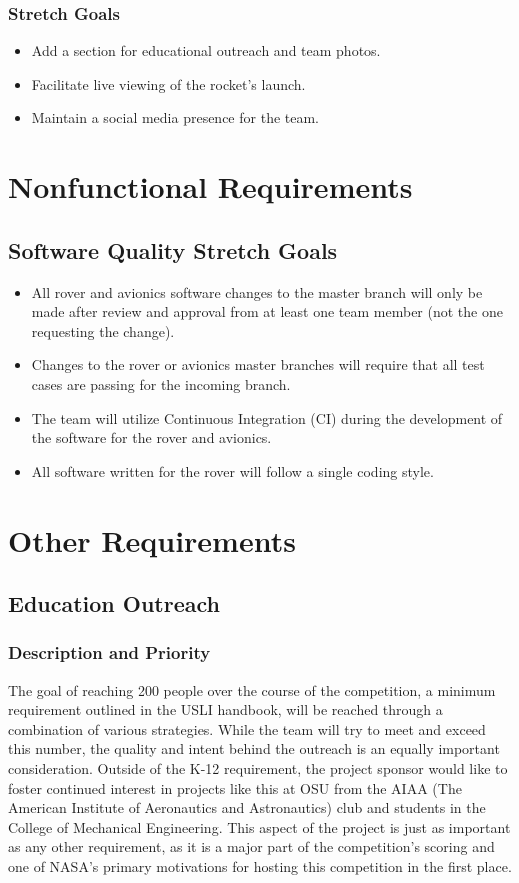\documentclass[onecolumn, draftclsnofoot, 10pt, compsoc]{IEEEtran}
\begin{document}
\subsubsection{Stretch Goals}
\begin{itemize}
\item Add a section for educational outreach and team photos.
\item Facilitate live viewing of the rocket's launch.
\item Maintain a social media presence for the team. 
\end{itemize}

\section{Nonfunctional Requirements}

\subsection{Software Quality Stretch Goals}
\begin{itemize}
\item All rover and avionics software changes to the master branch will only be made after review and approval from at least one team member (not the one requesting the change).
\item Changes to the rover or avionics master branches will require that all test cases are passing for the incoming branch.
\item The team will utilize Continuous Integration (CI) during the development of the software for the rover and avionics.
\item All software written for the rover will follow a single coding style.
\end{itemize}

\section{Other Requirements}
\subsection{Education Outreach}
\subsubsection{Description and Priority}
The goal of reaching 200 people over the course of the competition, a minimum requirement outlined in the USLI handbook, will be reached through a combination of various strategies. While the team will try to meet and exceed this number, the quality and intent behind the outreach is an equally important consideration. Outside of the K-12 requirement, the project sponsor would like to foster continued interest in projects like this at OSU from the AIAA (The American Institute of Aeronautics and Astronautics) club and students in the College of Mechanical Engineering. This aspect of the project is just as important as any other requirement, as it is a major part of the competition's scoring and one of NASA's primary motivations for hosting this competition in the first place. 
\end{document}

